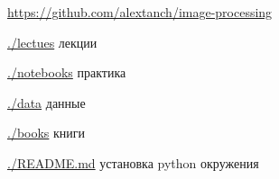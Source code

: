 \documentclass[
    12pt, 
    usepdftitle=false,
    aspectratio=1610
]{beamer}
\begin{document}
\begin{frame}
    \url{https://github.com/alextanch/image-processing}
    \vspace{0.5cm}

    \hspace{1cm}
    \url{./lectues} \hspace{1.3cm} лекции
    \vspace{0.2cm}

    \hspace{1cm}
    \url{./notebooks} \hspace{0.85cm} практика
    \vspace{0.2cm}
    
    
    \hspace{1cm}
    \url{./data} \hspace{2cm} данные
    \vspace{0.2cm}

    \hspace{1cm}
    \url{./books} \hspace{1.8cm} книги
    \vspace{0.2cm}

    \hspace{1cm}
    \url{./README.md}   \hspace{0.9cm} установка python окружения
    \vspace{0.2cm}

\end{frame}
\end{document}
